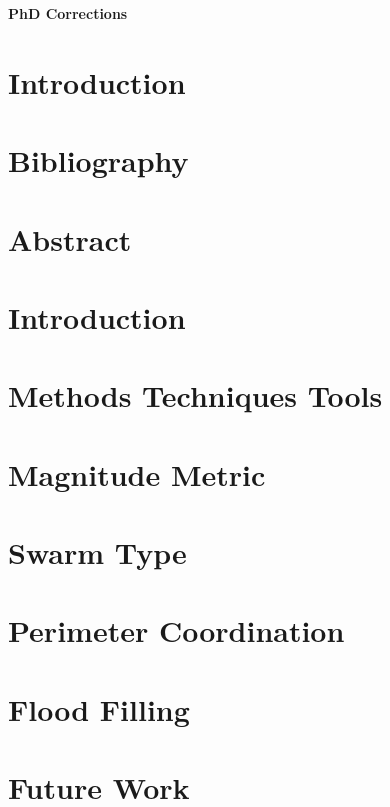 \documentclass[a4paper,11pt,nocenter,bold,notitlepage,noheadline,noindent]{report}
\begin{document}
\setcounter{section}{0}
\setcounter{chapter}{1}
\begin{Huge}
\begin{center}
\textbf{PhD Corrections}
\end{center}
\end{Huge}
\section{Introduction}

\section{Bibliography}

\section{Abstract}

\section{Introduction}

\section{Methods Techniques Tools}

\section{Magnitude Metric}\label{contrib1}

\section{Swarm Type}

\section{Perimeter Coordination}

\section{Flood Filling}

\section{Future Work}\label{paper1}
\end{document}
